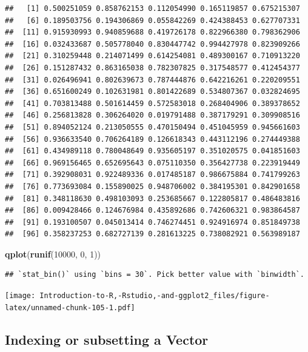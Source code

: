 \documentclass[]{book}
\newenvironment{Shaded}{\begin{snugshade}}{\end{snugshade}}
\newcommand{\DecValTok}[1]{\textcolor[rgb]{0.00,0.00,0.81}{#1}}
\newcommand{\KeywordTok}[1]{\textcolor[rgb]{0.13,0.29,0.53}{\textbf{#1}}}
\newcommand{\NormalTok}[1]{#1}
\begin{document}
\begin{verbatim}
##   [1] 0.500251059 0.858762153 0.112054990 0.165119857 0.675215307
##   [6] 0.189503756 0.194306869 0.055842269 0.424388453 0.627707331
##  [11] 0.915930993 0.940859688 0.419726178 0.822966380 0.798362906
##  [16] 0.032433687 0.505778040 0.830447742 0.994427978 0.823909266
##  [21] 0.310259448 0.214071499 0.614254081 0.489300167 0.710913220
##  [26] 0.151287432 0.863165038 0.782307825 0.317548577 0.412454377
##  [31] 0.026496941 0.802639673 0.787444876 0.642216261 0.220209551
##  [36] 0.651600249 0.102631981 0.801422689 0.534807367 0.032824695
##  [41] 0.703813488 0.501614459 0.572583018 0.268404906 0.389378652
##  [46] 0.256813828 0.306264020 0.019791488 0.387179291 0.309908516
##  [51] 0.894052124 0.213050555 0.470150494 0.451045959 0.945661603
##  [56] 0.936633540 0.706264189 0.126618343 0.443112196 0.274449388
##  [61] 0.434989118 0.780048649 0.935605197 0.351020575 0.041851603
##  [66] 0.969156465 0.652695643 0.075110350 0.356427738 0.223919449
##  [71] 0.392908031 0.922489336 0.017485187 0.986675884 0.741799263
##  [76] 0.773693084 0.155890025 0.948706002 0.384195301 0.842901658
##  [81] 0.348118630 0.498103093 0.253685667 0.122805817 0.486483816
##  [86] 0.009428466 0.124676984 0.435892686 0.742606321 0.983864587
##  [91] 0.193100507 0.045013414 0.746274451 0.924916974 0.851849738
##  [96] 0.358237253 0.682727139 0.281613225 0.738082921 0.563989187
\end{verbatim}

\begin{Shaded}
\begin{Highlighting}[]
\KeywordTok{qplot}\NormalTok{(}\KeywordTok{runif}\NormalTok{(}\DecValTok{10000}\NormalTok{, }\DecValTok{0}\NormalTok{, }\DecValTok{1}\NormalTok{))}
\end{Highlighting}
\end{Shaded}

\begin{verbatim}
## `stat_bin()` using `bins = 30`. Pick better value with `binwidth`.
\end{verbatim}

\texttt{[image: Introduction-to-R,-Rstudio,-and-ggplot2\_files/figure-latex/unnamed-chunk-105-1.pdf]}

\hypertarget{indexing-or-subsetting-a-vector}{%
\subsection{Indexing or subsetting a Vector}\label{indexing-or-subsetting-a-vector}}
\end{document}
